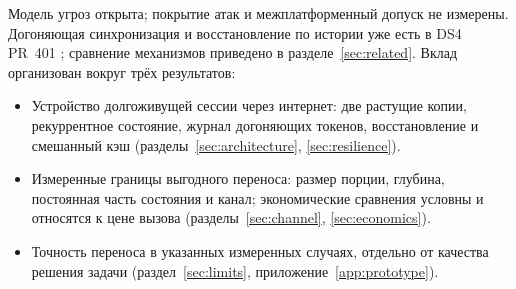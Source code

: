 Модель угроз открыта; покрытие атак и межплатформенный допуск не измерены. Догоняющая синхронизация и восстановление по истории уже есть в
DS4 PR~401 \cite{ds4code401}; сравнение механизмов приведено в разделе~\ref{sec:related}. Вклад организован
вокруг трёх результатов:
\begin{itemize}
\item Устройство долгоживущей сессии через интернет: две растущие копии, рекуррентное состояние,
журнал догоняющих токенов, восстановление и смешанный кэш (разделы~\ref{sec:architecture}, \ref{sec:resilience}).
\item Измеренные границы выгодного переноса: размер порции, глубина, постоянная часть состояния и канал;
экономические сравнения условны и относятся к цене вызова (разделы~\ref{sec:channel}, \ref{sec:economics}).
\item Точность переноса в указанных измеренных случаях, отдельно от качества решения задачи
(раздел~\ref{sec:limits}, приложение~\ref{app:prototype}).
\end{itemize}
